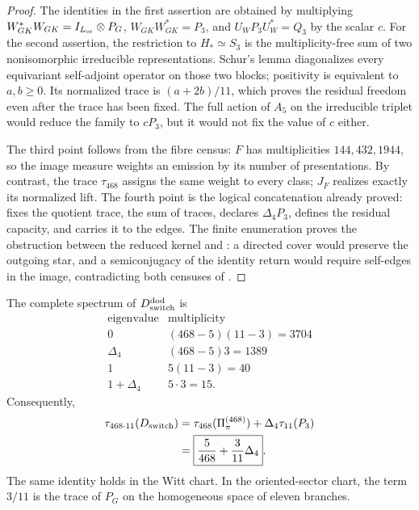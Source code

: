 \begin{proof}
The identities in the first assertion are obtained by multiplying
\(W_{GK}^{*}W_{GK}=I_{L_{\rm or}}\otimes P_G\),
\(W_{GK}W_{GK}^{*}=P_3\), and \(U_WP_3U_W^{*}=Q_3\) by the scalar \(c\).
For the second assertion, the restriction to \(H_*\simeq S_3\) is the multiplicity-free
sum of two nonisomorphic irreducible representations. Schur's lemma
diagonalizes every equivariant self-adjoint operator on those two blocks;
positivity is equivalent to \(a,b\geq0\). Its normalized trace is
\((a+2b)/11\), which proves the residual freedom even after the
trace has been fixed. The full action of \(A_5\) on the irreducible triplet would reduce
the family to \(cP_3\), but it would not fix the value of \(c\) either.

The third point follows from the fibre census: \(F\) has multiplicities \(144,432,1944\), so the image measure weights an emission by its number of presentations. By contrast, the trace \(\tau_{468}\) assigns the same weight to every class; \(J_F\) realizes exactly its normalized lift. The fourth point is the logical concatenation already proved: \HTr fixes the quotient trace, \HAdd the sum of traces, \HDef declares \(\Delta_4P_3\), \HRes defines the residual capacity, and \HLoc carries it to the edges. The finite enumeration proves the obstruction between the reduced kernel and \Gtr: a directed cover would preserve the outgoing star, and a semiconjugacy of the identity return would require self-edges in the image, contradicting both censuses of \Gtr.
\end{proof}

The complete spectrum of \(D_{\rm switch}^{\rm dod}\) is
\[
\begin{array}{c|c}
\text{eigenvalue}&\text{multiplicity}\\ \hline
0&(468-5)(11-3)=3704\\
\Delta_4&(468-5)3=1389\\
1&5(11-3)=40\\
1+\Delta_4&5\cdot3=15.
\end{array}
\]
Consequently,
\[
\begin{aligned}
 \tau_{468\cdot11}(D_{\rm switch})
 &=\tau_{468}(\Pi_\pi^{(468)})+\Delta_4\tau_{11}(P_3)\\
 &=\boxed{\frac5{468}+\frac3{11}\Delta_4}.
\end{aligned}
\]
The same identity holds in the Witt chart. In the oriented-sector chart, the term
\(3/11\) is the trace of \(P_G\) on the homogeneous space of eleven branches.

